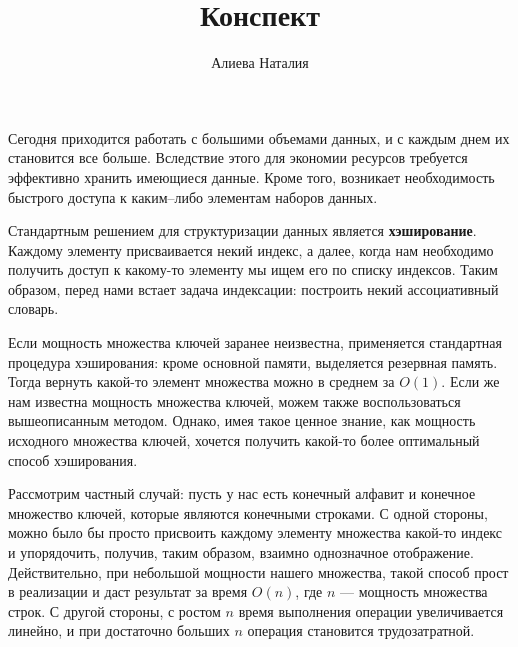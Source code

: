 \documentclass[specialist,
               substylefile = spbu.rtx,
               subf,href,colorlinks=true, 12pt]{disser}
\begin{document}


\title{Конспект}


\author{Алиева Наталия}


\date{\number\year}

\maketitle

\tableofcontents

\intro

Сегодня приходится работать с большими объемами данных, и с каждым днем их становится все больше. Вследствие этого  для экономии ресурсов требуется эффективно хранить имеющиеся данные. Кроме того, возникает необходимость быстрого доступа к каким--либо элементам наборов данных.

Стандартным решением для структуризации данных является \textbf{хэширование}. Каждому элементу присваивается некий индекс, а далее, когда нам необходимо получить доступ к какому-то элементу мы ищем его по списку индексов. Таким образом, перед нами встает задача индексации: построить некий ассоциативный словарь.

Если мощность множества ключей заранее неизвестна, применяется стандартная процедура хэширования: кроме основной памяти, выделяется резервная память. Тогда вернуть какой-то элемент множества можно в среднем за $\mathit{O}(1)$. Если же нам известна мощность множества ключей, можем также воспользоваться вышеописанным методом. Однако, имея такое ценное знание, как мощность исходного множества ключей, хочется получить какой-то более оптимальный способ хэширования.

Рассмотрим частный случай: пусть у нас есть конечный алфавит и конечное множество ключей, которые являются конечными строками. С одной стороны, можно было бы просто присвоить каждому элементу множества какой-то индекс и упорядочить, получив, таким образом, взаимно однозначное отображение. Действительно, при небольшой мощности нашего множества, такой способ прост в реализации и даст результат за время $\mathit{O}(n)$, где $n$ --- мощность множества строк. С другой стороны, с ростом $n$ время выполнения операции увеличивается линейно, и при достаточно больших $n$ операция становится трудозатратной.
\end{document}
